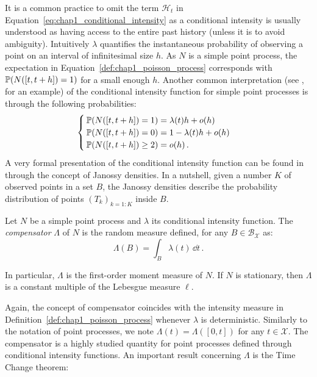 It is a common practice to omit the term $\mathcal{H}_t$ in Equation~\eqref{eq:chap1_conditional_intensity} as a conditional intensity is usually understood as having access to the entire past history (unless it is to avoid ambiguity).
Intuitively $\lambda$ quantifies the instantaneous probability of observing a point on an interval of infinitesimal size $h$.
As $N$ is a simple point process, the expectation in Equation~\eqref{def:chap1_poisson_process} corresponds with ${\mathbb P}(N([t, t+h]) = 1)$ for a small enough $h$.
Another common interpretation (see \textcite{Hawkes1971}, for an example) of the conditional intensity function for simple point processes is through the following probabilities:
\[
    \begin{cases}
{\mathbb P}(N([t, t+h]) = 1) = \lambda(t) h + o(h)\\
{\mathbb P}(N([t, t+h]) = 0) = 1 - \lambda(t) h + o(h)\\
{\mathbb P}(N([t, t+h]) \geq 2)= o(h)\,.
    \end{cases}
\]
A very formal presentation of the conditional intensity function can be found in \textcite[Chapter 7]{DaleyV1} through the concept of Janossy densities.
In a nutshell, given a number $K$ of observed points in a set $B$, the Janossy densities describe the probability distribution of points $(T_k)_{k=1:K}$ inside $B$.

\begin{definition}
    Let $N$ be a simple point process and $\lambda$ its conditional intensity function.
    The \emph{compensator} $\Lambda$ of $N$ is the random measure defined, for any $B\in\mathcal{B}_{\mathcal{X}}$ as:
    \[\Lambda(B) = \int_{B}{\lambda(t)\,\dd t}\,.\]

    In particular, $\Lambda$ is the first-order moment measure of $N$.
    If $N$ is stationary, then $\Lambda$ is a constant multiple of the Lebesgue measure $\ell$.
\end{definition}
Again, the concept of compensator coincides with the intensity measure in Definition~\ref{def:chap1_poisson_process} whenever $\lambda$ is deterministic.
Similarly to the notation of point processes, we note $\Lambda(t) = \Lambda([0,t])$ for any $t\in\mathcal{X}$.
The compensator is a highly studied quantity for point processes defined through conditional intensity functions.
An important result concerning $\Lambda$ is the Time Change theorem:

